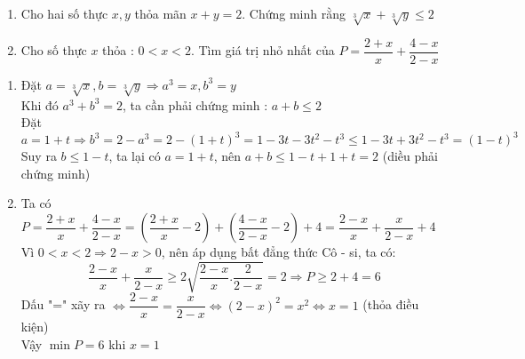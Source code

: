 \begin{ex}%
\hfill
    \begin{enumerate}
        \item Cho hai số thực $x,y$ thỏa mãn $x+y=2$. Chứng minh rằng $\sqrt[3]{x}+\sqrt[3]{y}\leq 2$
        \item Cho số thực $x$ thỏa : $0<x<2$. Tìm giá trị nhỏ nhất của $P=\dfrac{2+x}{x}+\dfrac{4-x}{2-x}$
    \end{enumerate}
\loigiai
    {\hfill
          \begin{enumerate}
        \item Đặt $a=\sqrt[3]{x}, b=\sqrt[3]{y}\Rightarrow a^3=x, b^3=y$\\
        Khi đó $a^3+b^3=2$, ta cần phải chứng minh : $a+b\leq 2$\\
        Đặt $a=1+t\Rightarrow b^3=2-a^3=2-(1+t)^3=1-3t-3t^2-t^3\leq 1-3t+3t^2-t^3=(1-t)^3$\\
        Suy ra $b\leq 1-t$, ta lại có $a=1+t$, nên $a+b\leq 1-t+1+t=2$ (diều phải chứng minh)
        \item Ta có $P=\dfrac{2+x}{x}+\dfrac{4-x}{2-x}=\left(\dfrac{2+x}{x}-2\right)+\left(\dfrac{4-x}{2-x}-2\right)+4=\dfrac{2-x}{x}+\dfrac{x}{2-x}+4$\\
        Vì $0<x<2\Rightarrow 2-x>0$, nên áp dụng bất đẳng thức Cô - si, ta có: \\
        $$\dfrac{2-x}{x}+\dfrac{x}{2-x}\geq 2\sqrt{\dfrac{2-x}{x}.\dfrac{2}{2-x}}=2\Rightarrow P\geq 2+4=6$$
        Dấu "=" xãy ra $\Leftrightarrow \dfrac{2-x}{x}=\dfrac{x}{2-x}\Leftrightarrow (2-x)^2=x^2\Leftrightarrow x=1$ (thỏa điều kiện)\\
        Vậy $\min P=6$ khi $x=1$
       \end{enumerate}
    }
\end{ex}

